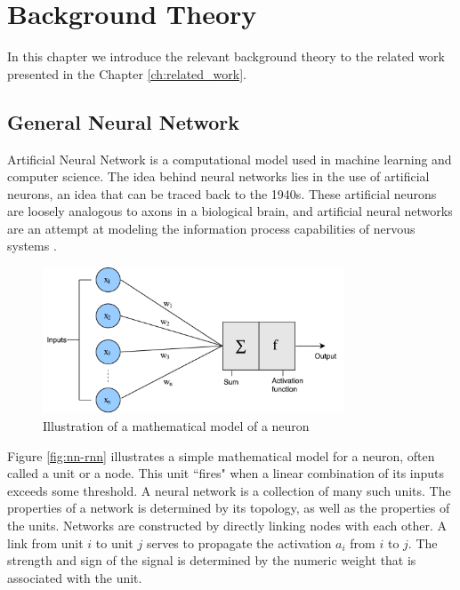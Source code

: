 
\chapter{Background Theory}
\label{ch:background}
In this chapter we introduce the relevant background theory to the related work presented in the Chapter \ref{ch:related_work}.


\section{General Neural Network}
Artificial Neural Network is a computational model used in machine learning and computer science. The idea behind neural networks lies in the use of artificial neurons, an idea that can be traced back to the 1940s. These artificial neurons are loosely analogous to axons in a biological brain, and artificial neural networks are an attempt at modeling the information process capabilities of nervous systems \citep{russell2010aimodernapproach}.

\begin{figure}[ht]
    \centering
    \includegraphics[width=0.8\textwidth]{fig/related_work/nn_perceptron.pdf}
    \caption{Illustration of a mathematical model of a neuron}
    \label{fig:nn-perceptron}
\end{figure}

Figure \ref{fig:nn-rnn} illustrates a simple mathematical model for a neuron, often called a unit or a node. This unit ``fires" when a linear combination of its inputs exceeds some threshold. A neural network is a collection of many such units. The properties of a network is determined by its topology, as well as the properties of the units. Networks are constructed by directly linking nodes with each other. A link from unit \(i\) to unit \(j\) serves to propagate the activation \(a_{i}\) from \(i\) to \(j\). The strength and sign of the signal is determined by the numeric weight that is associated with the unit. 

